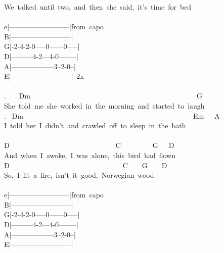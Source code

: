 {We\ talked\ until\ two,\ and\ then\ she\ said,\ it's\ time\ for\ bed\\
\\
e|--------------------------|from\ capo\\
B|--------------------------|\\
G|-2-4-2-0-----0------0-----|\\
D|---------4-2---4-0--------|\\
A|------------------3--2-0--|\\
E|--------------------------|\ 2x\\
\\
. \ \ \ Dm\ \ \ \ \ \ \ \ \ \ \ \ \ \ \ \ \ \ \ \ \ \ \ \ \ \ \ \ \ \ \ \ \ \ \ \ \ \ \ \ \ \ \ \ \ \ \ G\\
She\ told\ me\ she\ worked\ in\ the\ morning\ and\ started\ to\ laugh\\
. \ Dm\ \ \ \ \ \ \ \ \ \ \ \ \ \ \ \ \ \ \ \ \ \ \ \ \ \ \ \ \ \ \ \ \ \ \ \ \ \ \ \ \ \ \ \ \ \ \ \ Em\ \ \ A\\
I\ told\ her\ I\ didn't\ and\ crawled\ off\ to\ sleep\ in\ the\ bath\\
\\
D\ \ \ \ \ \ \ \ \ \ \ \ \ \ \ \ \ \ \ \ \ \ \ \ \ \ \ \ \ \ C\ \ \ \ \ \ \ \ \ G\ \ \ D\\
And\ when\ I\ awoke,\ I\ was\ alone,\ this\ bird\ had\ flown\\
D\ \ \ \ \ \ \ \ \ \ \ \ \ \ \ \ \ \ \ \ \ \ \ \ \ \ \ \ \ \ \ \ C\ \ \ \ G\ \ \ \ D\\
So,\ I\ lit\ a\ fire,\ isn't\ it\ good,\ Norwegian\ wood\\
\\
e|--------------------------|from\ capo\\
B|--------------------------|\\
G|-2-4-2-0-----0------0-----|\\
D|---------4-2---4-0--------|\\
A|------------------3--2-0--|\\
E|--------------------------|\ \\}
